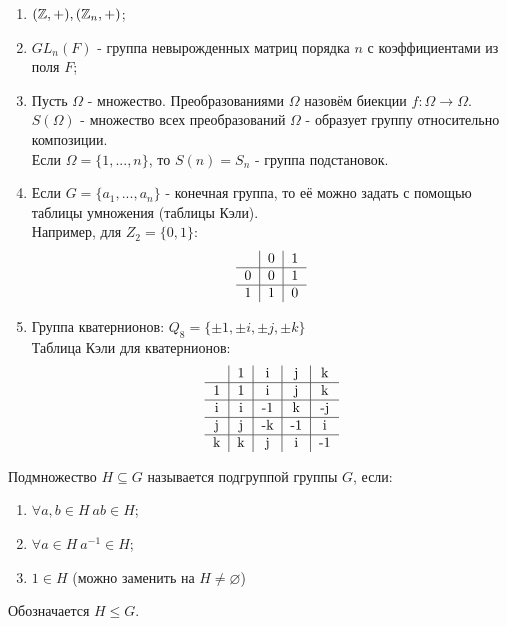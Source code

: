 \begin{examples} \tab
    \begin{enumerate}
        \item $(\mathbb{Z}, +), (\mathbb{Z}_n, +)$;
        \item $GL_n(F)$ - группа невырожденных матриц порядка $n$ с коэффициентами из поля $F$;
        \item Пусть $\Omega$ - множество. Преобразованиями $\Omega$ назовём биекции $f: \Omega \rightarrow \Omega$.\\
        $S(\Omega)$ - множество всех преобразований $\Omega$ - образует группу относительно композиции.\\
        Если $\Omega = \{1,...,n\}$, то $S(n) = S_n$ - группа подстановок.
        \item Если $G = \{a_1,...,a_n\}$ - конечная группа, то её можно задать с помощью таблицы умножения (таблицы Кэли).\\
        Например, для $Z_2 = \{0,1\}$:
        $$\begin{tabular}{c|c|c}
        \null & 0 & 1\\ \hline
        0 & 0 & 1 \\ \hline
        1 & 1 & 0
        \end{tabular}$$ 
        \item Группа кватернионов: $Q_8 = \{\pm 1, \pm i, \pm j, \pm k\}$\\
        Таблица Кэли для кватернионов:
        $$\begin{tabular}{c|c|c|c|c}
        \null & 1 & i & j & k \\ \hline
        1 & 1 & i & j & k \\ \hline
        i & i & -1 & k & -j \\ \hline
        j & j & -k & -1 & i \\ \hline
        k & k & j & i & -1
        \end{tabular}$$ 
    \end{enumerate}
\end{examples}
\begin{definition}
    Подмножество $H \subseteq G$ называется подгруппой группы $G$, если:
    \begin{enumerate}
        \item $\forall a, b \in H \ ab \in H$;
        \item $\forall a \in H \ a^{-1} \in H$;
        \item $1 \in H$ (можно заменить на $H \neq \varnothing$)
    \end{enumerate}
    Обозначается $H \leqslant G$.
\end{definition}
